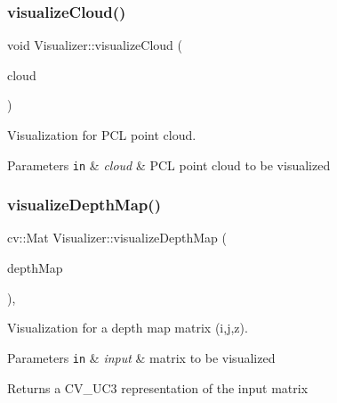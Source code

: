 \subsubsection{\texorpdfstring{visualize\+Cloud()}{visualizeCloud()}}
{\footnotesize\ttfamily void Visualizer\+::visualize\+Cloud (\begin{DoxyParamCaption}\item[{pcl\+::\+Point\+Cloud$<$ pcl\+::\+Point\+X\+YZ $>$\+::Ptr}]{cloud }\end{DoxyParamCaption})\hspace{0.3cm}{\ttfamily [static]}}



Visualization for P\+CL point cloud. 


\begin{DoxyParams}[1]{Parameters}
\mbox{\tt in}  & {\em cloud} & P\+CL point cloud to be visualized \\
\hline
\end{DoxyParams}
\hypertarget{class_visualizer_a5af40bebe3119c1d605351f42d2d8b95}{}\label{class_visualizer_a5af40bebe3119c1d605351f42d2d8b95} 
\subsubsection{\texorpdfstring{visualize\+Depth\+Map()}{visualizeDepthMap()}}
{\footnotesize\ttfamily cv\+::\+Mat Visualizer\+::visualize\+Depth\+Map (\begin{DoxyParamCaption}\item[{cv\+::\+Mat \&}]{depth\+Map }\end{DoxyParamCaption})\hspace{0.3cm}{\ttfamily [static]}, {\ttfamily [private]}}



Visualization for a depth map matrix (i,j,z). 


\begin{DoxyParams}[1]{Parameters}
\mbox{\tt in}  & {\em input} & matrix to be visualized \\
\hline
\end{DoxyParams}
\begin{DoxyReturn}{Returns}
a C\+V\+\_\+U\+C3 representation of the input matrix 
\end{DoxyReturn}
\hypertarget{class_visualizer_aa4436945eb7f9220b55d46914e8c5005}{}\label{class_visualizer_aa4436945eb7f9220b55d46914e8c5005} 
